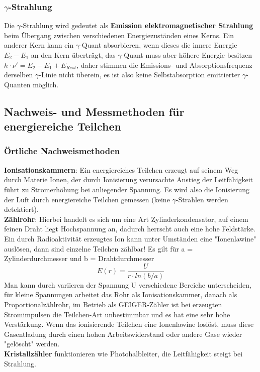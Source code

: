 \documentclass[12pt,a4paper,ngerman]{article}
\begin{document}
\subsubsection*{$\gamma$-Strahlung}
Die $\gamma$-Strahlung wird gedeutet als \textbf{Emission elektromagnetischer Strahlung} beim Übergang zwischen verschiedenen Energiezuständen eines Kerns. 
Ein anderer Kern kann ein $\gamma$-Quant absorbieren, wenn dieses die innere Energie $E_2-E_1$ an den Kern überträgt, das $\gamma$-Quant muss aber höhere Energie besitzen $h \cdot \nu' = E_2 - E_1 + E_{Rest}$, daher stimmen die Emissions- und Absorptionsfrequenz derselben $\gamma$-Linie nicht überein, es ist also keine Selbstabsorption emittierter $\gamma$-Quanten möglich. 


\subsection{Nachweis- und Messmethoden für energiereiche Teilchen}
\subsubsection*{Örtliche Nachweismethoden}
\textbf{Ionisationskammern}: Ein energiereiches Teilchen erzeugt auf seinem Weg durch Materie Ionen, der durch Ionisierung verursachte Anstieg der Leitfähigkeit führt zu Stromerhöhung bei anliegender Spannung. Es wird also die Ionisierung der Luft durch energiereiche Teilchen gemessen (keine $\gamma$-Strahlen werden detektiert). \\
\textbf{Zählrohr}: Hierbei handelt es sich um eine Art Zylinderkondensator, auf einem feinen Draht liegt Hochspannung an, dadurch herrscht auch eine hohe Feldstärke. Ein durch Radioaktivität erzeugtes Ion kann unter Umständen eine "Ionenlawine" auslösen, dann sind einzelne Teilchen zählbar! Es gilt für a = Zylinderdurchmesser und b = Drahtdurchmesser
\begin{equation}
E(r) = \frac{U}{r \cdot ln(b/a)}
\end{equation}
Man kann durch variieren der Spannung U verschiedene Bereiche unterscheiden, für kleine Spannungen arbeitet das Rohr als Ionisationskammer, danach als Proportionalzählrohr, im Betrieb als GEIGER-Zähler ist bei erzeugten Stromimpulsen die Teilchen-Art unbestimmbar und es hat eine sehr hohe Verstärkung. 
Wenn das ionisierende Teilchen eine Ionenlawine loslöst, muss diese Gasentladung durch einen hohen Arbeitswiderstand oder andere Gase wieder "gelöscht" werden. \\
\textbf{Kristallzähler} funktionieren wie Photohalbleiter, die Leitfähigkeit steigt bei Strahlung. 
\end{document}
